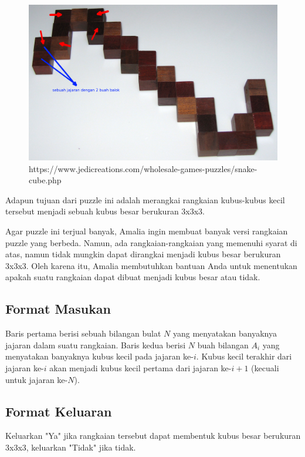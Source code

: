 \documentclass{article}
\begin{document}
\begin{itemize}
  \begin{figure}[h!]
    \centering
    \includegraphics[width=0.6\linewidth]{contoh-1.jpg}
    \caption{https://www.jedicreations.com/wholesale-games-puzzles/snake-cube.php}
  \end{figure}

\end{itemize}

\par\noindent Adapun tujuan dari puzzle ini adalah merangkai rangkaian kubus-kubus kecil tersebut menjadi sebuah kubus besar berukuran 3x3x3.

\par\noindent Agar puzzle ini terjual banyak, Amalia ingin membuat banyak versi rangkaian puzzle yang berbeda. Namun, ada rangkaian-rangkaian yang memenuhi syarat di atas, namun tidak mungkin dapat dirangkai menjadi kubus besar berukuran 3x3x3. Oleh karena itu, Amalia membutuhkan bantuan Anda untuk menentukan apakah suatu rangkaian dapat dibuat menjadi kubus besar atau tidak.

\subsection*{Format Masukan}

\par\noindent Baris pertama berisi sebuah bilangan bulat $N$ yang menyatakan banyaknya jajaran dalam suatu rangkaian. Baris kedua berisi $N$ buah bilangan $A_i$ yang menyatakan banyaknya kubus kecil pada jajaran ke-$i$. Kubus kecil terakhir dari jajaran ke-$i$ akan menjadi kubus kecil pertama dari jajaran ke-$i+1$ (kecuali untuk jajaran ke-$N$).

\subsection*{Format Keluaran}

\par\noindent Keluarkan "Ya" jika rangkaian tersebut dapat membentuk kubus besar berukuran 3x3x3, keluarkan "Tidak" jika tidak.
\end{document}
